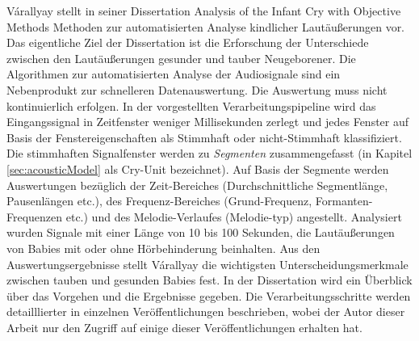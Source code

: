 Várallyay stellt in seiner Dissertation \glqq Analysis of the Infant Cry with Objective Methods\grqq{} \cite{cry_thesis} Methoden zur automatisierten Analyse kindlicher Lautäußerungen vor. Das eigentliche Ziel der Dissertation ist die Erforschung der Unterschiede zwischen den Lautäußerungen gesunder und tauber Neugeborener. Die Algorithmen zur automatisierten Analyse der Audiosignale sind ein \glqq Nebenprodukt\grqq{} zur schnelleren Datenauswertung. Die Auswertung muss nicht kontinuierlich erfolgen. In der vorgestellten Verarbeitungspipeline wird das Eingangssignal in Zeitfenster weniger Millisekunden zerlegt und jedes Fenster auf Basis der Fenstereigenschaften als Stimmhaft oder nicht-Stimmhaft klassifiziert. Die stimmhaften Signalfenster werden zu \emph{Segmenten} zusammengefasst (in Kapitel \ref{sec:acousticModel} als Cry-Unit bezeichnet). Auf Basis der Segmente werden Auswertungen bezüglich der Zeit-Bereiches (Durchschnittliche Segmentlänge, Pausenlängen etc.), des Frequenz-Bereiches (Grund-Frequenz, Formanten-Frequenzen etc.) und des Melodie-Verlaufes (Melodie-typ) angestellt. Analysiert wurden Signale mit einer Länge von 10 bis 100 Sekunden, die Lautäußerungen von Babies mit oder ohne Hörbehinderung beinhalten. Aus den Auswertungsergebnisse stellt Várallyay die wichtigsten Unterscheidungsmerkmale zwischen tauben und gesunden Babies fest. In der Dissertation \cite{cry_thesis} wird ein Überblick über das Vorgehen und die Ergebnisse gegeben. Die Verarbeitungsschritte werden detailllierter in einzelnen Veröffentlichungen beschrieben, wobei der Autor dieser Arbeit nur den Zugriff auf einige dieser Veröffentlichungen erhalten hat.

